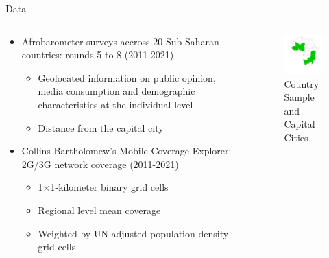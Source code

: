 \documentclass[10pt]{beamer}
\begin{document}
\begin{frame}{Data}
    
    \begin{columns}
    \begin{column}{0.5\textwidth}
    \begin{itemize}\setlength\itemsep{1em}
    \item Afrobarometer surveys accross 20 Sub-Saharan countries: rounds 5 to 8 (2011-2021)
    \vspace{0.05cm}
    \begin{itemize}\setlength\itemsep{0.05cm}
        \item Geolocated information on public opinion, media consumption and demographic characteristics at the individual level
        \item Distance from the capital city
    \end{itemize}
    \item Collins Bartholomew’s Mobile Coverage Explorer: 2G/3G network coverage (2011-2021)
    \begin{itemize}\setlength\itemsep{0.05cm}
        \vspace{0.05cm}
        \item 1×1-kilometer binary grid cells
        \item Regional level mean coverage
        \item Weighted by UN-adjusted population density grid cells
    \end{itemize}
    \end{itemize}
    
    \end{column}
    \begin{column}{0.5\textwidth}
    
    \begin{figure}
        \centering
        \caption{Country Sample and Capital Cities}
        \includegraphics[width=6cm]{obs_map.jpg}
    \end{figure}
    \end{column}
        \end{columns}
    \end{frame}
\end{document}

